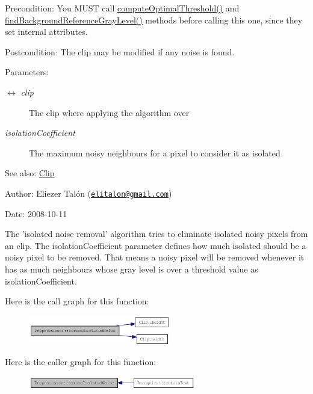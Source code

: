 \begin{Desc}
\item[Precondition:]You MUST call \hyperlink{class_preprocessor_ac2f414d6f4f917419f33f6067eb8634}{computeOptimalThreshold()} and \hyperlink{class_preprocessor_a941f81382bd8e235e4dd12481342be4}{findBackgroundReferenceGrayLevel()} methods before calling this one, since they set internal attributes.\end{Desc}
\begin{Desc}
\item[Postcondition:]The clip may be modified if any noise is found.\end{Desc}
\begin{Desc}
\item[Parameters:]
\begin{description}
\item[\mbox{$\leftrightarrow$} {\em clip}]The clip where applying the algorithm over \item[{\em isolationCoefficient}]The maximum noisy neighbours for a pixel to consider it as isolated\end{description}
\end{Desc}
\begin{Desc}
\item[See also:]\hyperlink{class_clip}{Clip}\end{Desc}
\begin{Desc}
\item[Author:]Eliezer Talón (\href{mailto:elitalon@gmail.com}{\tt elitalon@gmail.com}) \end{Desc}
\begin{Desc}
\item[Date:]2008-10-11\end{Desc}
The 'isolated noise removal' algorithm tries to eliminate isolated noisy pixels from an clip. The isolationCoefficient parameter defines how much isolated should be a noisy pixel to be removed. That means a noisy pixel will be removed whenever it has as much neighbours whose gray level is over a threshold value as isolationCoefficient. 

Here is the call graph for this function:\nopagebreak
\begin{figure}[H]
\begin{center}
\leavevmode
\includegraphics[width=176pt]{class_preprocessor_a3e047486a0a80f2103f51d7141e41c5_cgraph}
\end{center}
\end{figure}


Here is the caller graph for this function:\nopagebreak
\begin{figure}[H]
\begin{center}
\leavevmode
\includegraphics[width=207pt]{class_preprocessor_a3e047486a0a80f2103f51d7141e41c5_icgraph}
\end{center}
\end{figure}
